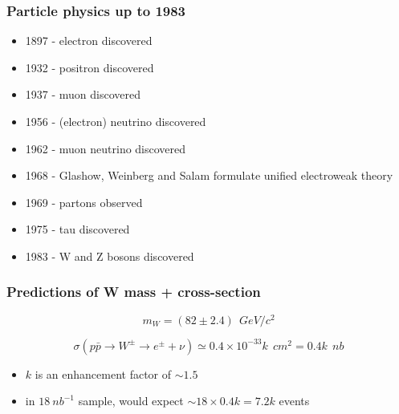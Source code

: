 \documentclass[xcolor=table]{beamer}
\begin{document}
\begin{frame}
\frametitle{Particle physics up to 1983}
\fontsize{9pt}{12}\selectfont

\begin{itemize}
\item 1897 - electron discovered
\item 1932 - positron discovered
\item 1937 - muon discovered
\item 1956 - (electron) neutrino discovered
\item 1962 - muon neutrino discovered
\item 1968 - Glashow, Weinberg and Salam formulate unified electroweak theory
\item 1969 - partons observed
\item 1975 - tau discovered
\item 1983 - W and Z bosons discovered
\end{itemize}


\end{frame}


\begin{frame}
\frametitle{Predictions of W mass + cross-section}
\fontsize{11pt}{10}\selectfont


\begin{equation*}
m_{W}=(82\pm 2.4)~\SI{}{GeV/c^2}
\end{equation*}

\begin{equation*}
\sigma(p\bar{p}\to W^{\pm}\to e^{\pm}+\nu)\simeq 0.4\times 10^{-33} k ~\SI{}{cm^2}= 0.4k~\SI{}{nb}
\end{equation*}

\begin{itemize}
\item $k$ is an enhancement factor of $\sim 1.5$
\item in $\SI{18}{nb^{-1}}$ sample, would expect $\sim 18\times 0.4k=7.2k$ events
\end{itemize}


\end{frame}


\end{document}
